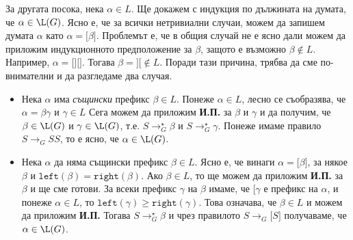 \begin{hint}
  За другата посока, нека $\alpha \in L$.
  Ще докажем с индукция по дължината на думата, че $\alpha \in \L(G)$.
  Ясно е, че за всички нетривиални случаи, можем да запишем думата $\alpha$ като $\alpha = \texttt{[}\beta\texttt{]}$.
  Проблемът е, че в общия случай не е ясно дали можем да приложим индукционното предположение за $\beta$,
  защото е възможно $\beta \not\in L$. Например, $\alpha = \texttt{[][]}$.
  Тогава $\beta = \texttt{][} \not \in L$.
  Поради тази причина, трябва да сме по-внимателни и да разгледаме два случая.
  \begin{itemize}
  \item 
    Нека $\alpha$ има {\em същински} префикс $\beta \in L$.
    Понеже $\alpha \in L$, лесно се съобразява, че $\alpha = \beta\gamma$ и $\gamma \in L$
    Сега можем да приложим {\bf И.П.} за $\beta$ и $\gamma$ и да получим, че 
    $\beta \in \L(G)$ и $\gamma \in \L(G)$, т.е.
    $S \to^\star_G \beta$ и $S \to^\star_G \gamma$.
    Понеже имаме правило $S \to_G SS$, то е ясно, че $\alpha \in \L(G)$.
  \item
    Нека $\alpha$ да няма същински префикс $\beta \in L$.
    Ясно е, че винаги $\alpha = \texttt{[}\beta\texttt{]}$, за някое $\beta$
    и $\texttt{left}(\beta) = \texttt{right}(\beta)$. Ако $\beta \in L$, то ще можем да приложим {\bf И.П.}
    за $\beta$ и ще сме готови.
    За всеки префикс $\gamma$ на $\beta$ имаме, че $\texttt{[}\gamma$ е префикс на $\alpha$,
    и понеже $\alpha \in L$, то $\texttt{left}(\gamma) \geq \texttt{right}(\gamma)$.
    Това означава, че $\beta \in L$ и можем да приложим {\bf И.П.}
    Тогава $S \to^\star_G \beta$ и чрез правилото $S \to_G \texttt{[}S\texttt{]}$
    получаваме, че $\alpha \in \L(G)$.    
  \end{itemize}
\end{hint}

